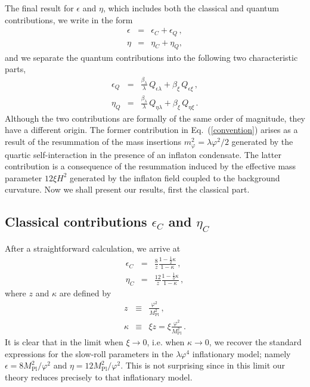 \documentclass[aps,12pt,superscriptaddress,preprintnumbers,
                secnumarabic,nofootinbib,showpacs]{revtex4}
\begin{document}
The final result for $\epsilon$ and $\eta$, which includes both
the classical and quantum contributions, we write in the form
\begin{eqnarray}
\epsilon &=& \epsilon_C + \epsilon_Q\,,\nonumber\\
\eta &=& \eta_C + \eta_Q,
\end{eqnarray}
and we separate the quantum contributions into the following
two characteristic parts,
\begin{eqnarray}
\epsilon_Q &=& \frac{\beta_{\lambda}}{\lambda}\,Q_{\epsilon\lambda}
            + \beta_{\xi}\,Q_{\epsilon\xi}\,,\nonumber\\
    \eta_Q &=& \frac{\beta_{\lambda}}{\lambda}\,Q_{\eta\lambda} +
               \beta_{\xi}\,Q_{\eta\xi}
\,.
\label{convention}
\end{eqnarray}
Although the two contributions are formally of the same order of magnitude,
they have a different origin. The former contribution
in Eq.~(\ref{convention}) arises as a result of
the resummation of the mass insertions
$m_\varphi^2 =\lambda\varphi^2/2$ generated by the quartic self-interaction
in the presence of an inflaton condensate. The latter contribution
is a consequence of the resummation induced by the effective mass parameter
$12\xi H^2$ generated by the inflaton field coupled to the background
curvature. Now we shall present our results, first the classical part.

\subsection{Classical contributions $\epsilon_C$ and $\eta_C$}

After a straightforward calculation, we arrive at
\begin{eqnarray}
\epsilon_C &=&
\frac{8}{z}\frac{1-\frac12\kappa}{1-\kappa}\,,\nonumber\\
\eta_C &=& \frac{12}{z}\frac{1-\frac13\kappa}{1-\kappa}\,,
\label{classical}
\end{eqnarray}
where $z$ and $\kappa$ are defined by
\begin{eqnarray}
z &\equiv& \frac{\varphi^2}{M_{\mathrm{Pl}}^2}\,,\nonumber\\
\kappa &\equiv& \xi z = \xi\frac{\varphi^2}{M_{\mathrm{Pl}}^2} \,.
\label{zkappa}
\end{eqnarray}
It is clear that in the limit when $\xi\rightarrow 0$, i.e. when
$\kappa\rightarrow 0$, we recover the standard expressions for the
slow-roll parameters in the $\lambda\varphi^4$ inflationary model;
namely $\epsilon = 8{M_{\mathrm{Pl}}^2}/{\varphi^2}$ and
$\eta = 12{M_{\mathrm{Pl}}^2}/{\varphi^2}$. This is not surprising
since in this limit our theory reduces precisely to that inflationary model.
\end{document}
